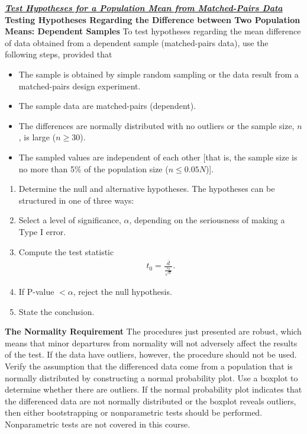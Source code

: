 \documentclass{report}
\begin{document}
    \pagebreak \bigbreak \noindent 
    \textbf{\textit{\underline{Test Hypotheses for a Population Mean from Matched-Pairs Data}}}
    \bigbreak \noindent 
    \textbf{Testing Hypotheses Regarding the Difference between Two Population Means: Dependent Samples}
    \bigbreak \noindent 
    To test hypotheses regarding the mean difference of data obtained from a dependent sample (matched-pairs data), use the following steps, provided that
    \begin{itemize}
        \item The sample is obtained by simple random sampling or the data result from a matched-pairs design experiment.
        \item The sample data are matched-pairs (dependent).
        \item The differences are normally distributed with no outliers or the sample size, $n$, is large ($n \geq 30$).
        \item The sampled values are independent of each other [that is, the sample size is no more than 5\% of the population size ($n \leq 0.05N$)].
    \end{itemize}
    \begin{enumerate}
        \item Determine the null and alternative hypotheses. The hypotheses can be structured in one of three ways:
        \item Select a level of significance, $\alpha $, depending on the seriousness of making a Type I error.
        \item Compute the test statistic
            \begin{align*}
                t_{0} =\frac{\bar{d}}{\frac{s_{d}}{\sqrt{n}}}
            .\end{align*}
        \item If P-value $<\alpha $, reject the null hypothesis.
        \item State the conclusion.
    \end{enumerate}

    \bigbreak \noindent
    \textbf{The Normality Requirement}
    \bigbreak \noindent 
    The procedures just presented are robust, which means that minor departures from normality will not adversely affect the results of the test. If the data have outliers, however, the procedure should not be used.
    \bigbreak \noindent 
    Verify the assumption that the differenced data come from a population that is normally distributed by constructing a normal probability plot. Use a boxplot to determine whether there are outliers. If the normal probability plot indicates that the differenced data are not normally distributed or the boxplot reveals outliers, then either bootstrapping or nonparametric tests should be performed. Nonparametric tests are not covered in this course.
\end{document}
